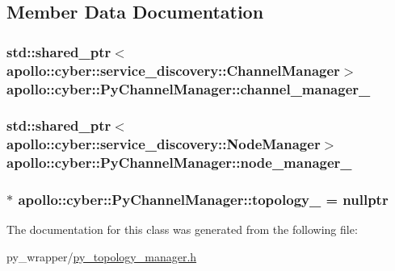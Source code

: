 \subsection{Member Data Documentation}
\hypertarget{classapollo_1_1cyber_1_1PyChannelManager_adf83b1bd71811828a97febc9d3080eb6}{
\subsubsection[{channel\-\_\-manager\-\_\-}]{\setlength{\rightskip}{0pt plus 5cm}std\-::shared\-\_\-ptr$<${\bf apollo\-::cyber\-::service\-\_\-discovery\-::\-Channel\-Manager}$>$ apollo\-::cyber\-::\-Py\-Channel\-Manager\-::channel\-\_\-manager\-\_\-\hspace{0.3cm}{\ttfamily [private]}}}\label{classapollo_1_1cyber_1_1PyChannelManager_adf83b1bd71811828a97febc9d3080eb6}
\hypertarget{classapollo_1_1cyber_1_1PyChannelManager_a6303387a1cf513d8273cb0f053bb968a}{
\subsubsection[{node\-\_\-manager\-\_\-}]{\setlength{\rightskip}{0pt plus 5cm}std\-::shared\-\_\-ptr$<${\bf apollo\-::cyber\-::service\-\_\-discovery\-::\-Node\-Manager}$>$ apollo\-::cyber\-::\-Py\-Channel\-Manager\-::node\-\_\-manager\-\_\-\hspace{0.3cm}{\ttfamily [private]}}}\label{classapollo_1_1cyber_1_1PyChannelManager_a6303387a1cf513d8273cb0f053bb968a}
\hypertarget{classapollo_1_1cyber_1_1PyChannelManager_a822395e10ee276181538accdf963954a}{
\subsubsection[{topology\-\_\-}]{$\ast$ apollo\-::cyber\-::\-Py\-Channel\-Manager\-::topology\-\_\- = nullptr\hspace{0.3cm}{\ttfamily [private]}}}\label{classapollo_1_1cyber_1_1PyChannelManager_a822395e10ee276181538accdf963954a}


The documentation for this class was generated from the following file\-:\begin{DoxyCompactItemize}
\item 
py\-\_\-wrapper/\hyperlink{py__topology__manager_8h}{py\-\_\-topology\-\_\-manager.\-h}\end{DoxyCompactItemize}
